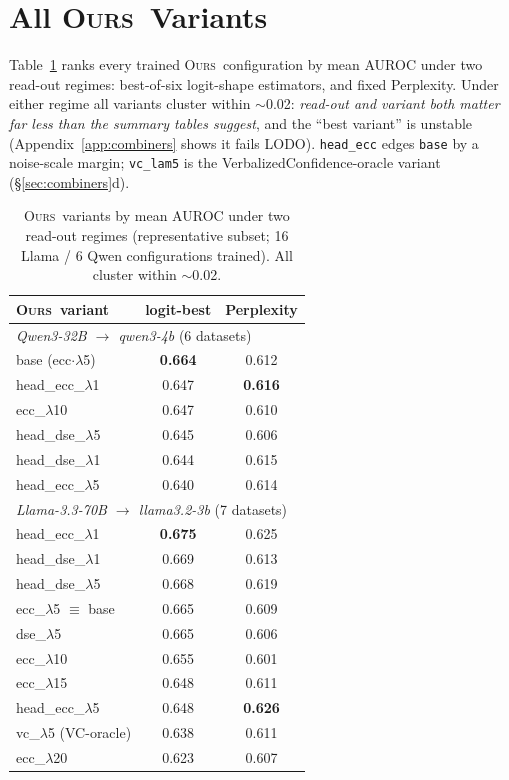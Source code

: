 \documentclass[11pt]{article}
\newcommand{\ours}{\textsc{Ours}}
\newcommand{\best}[1]{\textbf{#1}}
\begin{document}
\section{All \ours\ Variants}\label{app:variants}
Table~\ref{tab:app-variants} ranks every trained \ours\ configuration by mean AUROC under
two read-out regimes: best-of-six logit-shape estimators, and fixed Perplexity. Under
either regime all variants cluster within $\sim$0.02: \emph{read-out and variant both
matter far less than the summary tables suggest}, and the ``best variant'' is unstable
(Appendix~\ref{app:combiners} shows it fails LODO). \texttt{head\_ecc} edges \texttt{base}
by a noise-scale margin; \texttt{vc\_lam5} is the VerbalizedConfidence-oracle variant
(\S\ref{sec:combiners}d).

\begin{table}[t]\centering\small
\setlength{\tabcolsep}{4pt}
\begin{tabular}{l cc}
\toprule
\ours\ variant & logit-best & Perplexity\\
\midrule
\multicolumn{3}{l}{\emph{Qwen3-32B $\to$ qwen3-4b} (6 datasets)}\\
base (ecc$\cdot\lambda$5) & \best{0.664} & 0.612\\
head\_ecc\_$\lambda$1     & 0.647 & \best{0.616}\\
ecc\_$\lambda$10          & 0.647 & 0.610\\
head\_dse\_$\lambda$5     & 0.645 & 0.606\\
head\_dse\_$\lambda$1     & 0.644 & 0.615\\
head\_ecc\_$\lambda$5     & 0.640 & 0.614\\
\midrule
\multicolumn{3}{l}{\emph{Llama-3.3-70B $\to$ llama3.2-3b} (7 datasets)}\\
head\_ecc\_$\lambda$1     & \best{0.675} & 0.625\\
head\_dse\_$\lambda$1     & 0.669 & 0.613\\
head\_dse\_$\lambda$5     & 0.668 & 0.619\\
ecc\_$\lambda$5 $\equiv$ base & 0.665 & 0.609\\
dse\_$\lambda$5           & 0.665 & 0.606\\
ecc\_$\lambda$10          & 0.655 & 0.601\\
ecc\_$\lambda$15          & 0.648 & 0.611\\
head\_ecc\_$\lambda$5     & 0.648 & \best{0.626}\\
vc\_$\lambda$5 (VC-oracle)& 0.638 & 0.611\\
ecc\_$\lambda$20          & 0.623 & 0.607\\
\bottomrule
\end{tabular}
\caption{\ours\ variants by mean AUROC under two read-out regimes (representative subset;
16 Llama / 6 Qwen configurations trained). All cluster within $\sim$0.02.}
\label{tab:app-variants}
\end{table}
\end{document}
